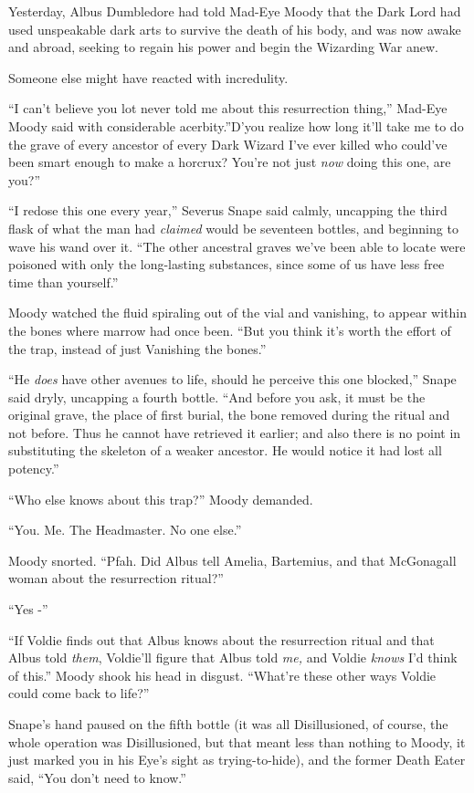 Yesterday, Albus Dumbledore had told Mad-Eye Moody that the Dark Lord
had used unspeakable dark arts to survive the death of his body, and was
now awake and abroad, seeking to regain his power and begin the
Wizarding War anew.

Someone else might have reacted with incredulity.

``I can't believe you lot never told me about this resurrection thing,''
Mad-Eye Moody said with considerable acerbity.''D'you realize how long
it'll take me to do the grave of every ancestor of every Dark Wizard
I've ever killed who could've been smart enough to make a horcrux?
You're not just \emph{now} doing this one, are you?''

``I redose this one every year,'' Severus Snape said calmly, uncapping
the third flask of what the man had \emph{claimed} would be seventeen
bottles, and beginning to wave his wand over it. ``The other ancestral
graves we've been able to locate were poisoned with only the
long-lasting substances, since some of us have less free time than
yourself.''

Moody watched the fluid spiraling out of the vial and vanishing, to
appear within the bones where marrow had once been. ``But you think it's
worth the effort of the trap, instead of just Vanishing the bones.''

``He \emph{does} have other avenues to life, should he perceive this one
blocked,'' Snape said dryly, uncapping a fourth bottle. ``And before you
ask, it must be the original grave, the place of first burial, the bone
removed during the ritual and not before. Thus he cannot have retrieved
it earlier; and also there is no point in substituting the skeleton of a
weaker ancestor. He would notice it had lost all potency.''

``Who else knows about this trap?'' Moody demanded.

``You. Me. The Headmaster. No one else.''

Moody snorted. ``Pfah. Did Albus tell Amelia, Bartemius, and that
McGonagall woman about the resurrection ritual?''

``Yes -''

``If Voldie finds out that Albus knows about the resurrection ritual and
that Albus told \emph{them}, Voldie'll figure that Albus told \emph{me,}
and Voldie \emph{knows} I'd think of this.'' Moody shook his head in
disgust. ``What're these other ways Voldie could come back to life?''

Snape's hand paused on the fifth bottle (it was all Disillusioned, of
course, the whole operation was Disillusioned, but that meant less than
nothing to Moody, it just marked you in his Eye's sight as
trying-to-hide), and the former Death Eater said, ``You don't need to
know.''

